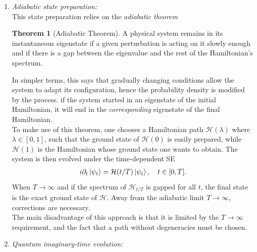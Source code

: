 \documentclass{book}
\theoremstyle{definition}
\newtheorem{thm}{Theorem}[section]
\newcommand{\p}{\partial}
\newcommand{\had}{\mathcal{H}}
\begin{document}
\begin{enumerate}
	\item \textit{Adiabatic state preparation:}\\
	
	 
	This state preparation relies on the \textit{adiabatic theorem}
	
	
	\begin{thm}[Adiabatic Theorem]
		A physical system remains in its instantaneous eigenstate if a given perturbation is acting on it slowly enough and if there is a gap between the eigenvalue and the rest of the Hamiltonian's spectrum. 
	\end{thm}
	In simpler terms, this says that gradually changing conditions allow the system to adapt its configuration, hence the probability density is modified by the process. if the system started in an eigenstate of the initial Hamiltonian, it will end in the \textit{corresponding} eigenstate of the final Hamiltonian.\\
	
	To make use of this theorem, one chooses a Hamiltonian path $\had(\lambda)$ where $\lambda \in [0,1]$, such that the ground state of $\had(0)$ is easily prepared, while $\had(1)$ is the Hamiltonian whose ground state one wants to obtain. The system is then evolved under the time-dependent SE 
	\begin{align}
	i\p_t \ket{\psi_t} = \had(t/T)\ket{\psi_t},\quad t \in [0,T].
	\end{align}
	When $T\to \infty$ and if the spectrum of $\had_{t/T}$ is gapped for all $t$, the final state is the exact ground state of $\had$. Away from the adiabatic limit $T\to \infty$, corrections are necessary. \\
	
	The main disadvantage of this approach is that it is limited by the $T\to \infty$ requirement, and the fact that a path without degeneracies must be chosen. 
	
	
	\item \textit{Quantum imaginary-time evolution:} \\
	

\end{enumerate}
\end{document}
